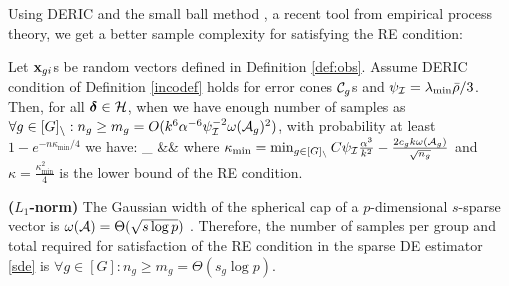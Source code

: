  Using DERIC and the small ball method \cite{mend15}, a recent tool from empirical process theory, we get a better sample complexity for satisfying the RE condition:
\begin{theorem}
	\label{theo:re}
	Let $\mathbf{x}_{gi}$s	be random vectors defined in Definition \ref{def:obs}.
	Assume DERIC condition of Definition \ref{incodef} holds for error cones ${\cal C}_g$s and $\psi_{{\cal{I}}}=\lambda_{\min}\bar{\rho}/3$.
	Then, for all $\boldsymbol{\delta} \in {\cal H}$, when we have enough number of samples as $\forall g \in [G]_{\setminus}: n_g \geq m_g = O(k^6 \alpha^{-6} \psi_{{\cal{I}}}^{-2} \omega({\cal A}_g)^2)$, with probability at least $1 - e^{-n \kappa_{\min}/4}$  we have:
	\be
	\nr
	\inf_{\ddelta \in \cH}   &\geq& 
	\ee
	where $\kappa_{\min} = \min_{g\in [G]_\setminus} C \psi_{{\cal{I}}} \frac{\alpha^3}{k^2}  - \frac{2 c_g k \omega({\cal A}_g)}{\sqrt{n_g}}$ and $\kappa = \frac{\kappa_{\min}^2}{4}$ is the lower bound of the RE condition.
\end{theorem}

\begin{example}
	{\bf ($L_1$-norm)} The Gaussian width of the spherical cap of a $p$-dimensional $s$-sparse vector is $\omega({\cal A}) = \Theta(\sqrt{s\log p})$ \cite{banerjee14, vershynin2018high}. Therefore, the number of samples per group and total required for satisfaction of the RE condition in the sparse DE estimator \eqref{sde} is $\forall g \in [G]: n_g \geq m_g = \Theta(s_g \log p)$. 
\end{example}



